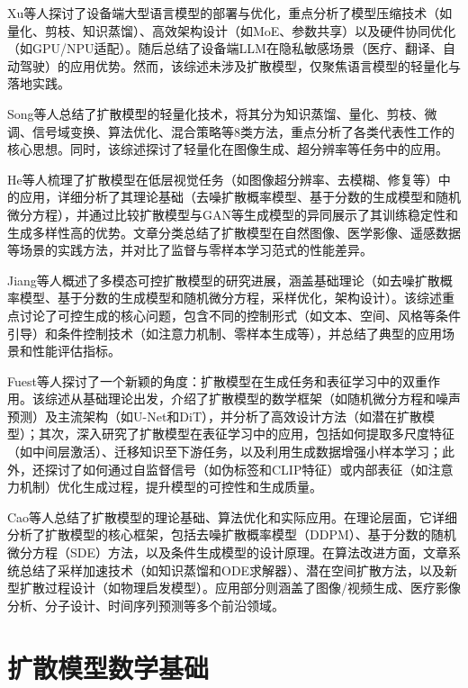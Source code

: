 \documentclass[11pt,a4paper,UTF8]{ctexart}
\begin{document}
Xu等人\cite{xu2024device}探讨了设备端大型语言模型的部署与优化，重点分析了模型压缩技术（如量化、剪枝、知识蒸馏）、高效架构设计（如MoE、参数共享）以及硬件协同优化（如GPU/NPU适配）。随后总结了设备端LLM在隐私敏感场景（医疗、翻译、自动驾驶）的应用优势。然而，该综述未涉及扩散模型，仅聚焦语言模型的轻量化与落地实践。

Song等人\cite{song2024lightweight}总结了扩散模型的轻量化技术，将其分为知识蒸馏、量化、剪枝、微调、信号域变换、算法优化、混合策略等8类方法，重点分析了各类代表性工作的核心思想。同时，该综述探讨了轻量化在图像生成、超分辨率等任务中的应用。

He等人\cite{he2025diffusion}梳理了扩散模型在低层视觉任务（如图像超分辨率、去模糊、修复等）中的应用，详细分析了其理论基础（去噪扩散概率模型、基于分数的生成模型和随机微分方程），并通过比较扩散模型与GAN等生成模型的异同展示了其训练稳定性和生成多样性高的优势。文章分类总结了扩散模型在自然图像、医学影像、遥感数据等场景的实践方法，并对比了监督与零样本学习范式的性能差异。

Jiang等人\cite{jiang2024survey}概述了多模态可控扩散模型的研究进展，涵盖基础理论（如去噪扩散概率模型、基于分数的生成模型和随机微分方程，采样优化，架构设计）。该综述重点讨论了可控生成的核心问题，包含不同的控制形式（如文本、空间、风格等条件引导）和条件控制技术（如注意力机制、零样本生成等），并总结了典型的应用场景和性能评估指标。

Fuest等人\cite{fuest2024diffusion}探讨了一个新颖的角度：扩散模型在生成任务和表征学习中的双重作用。该综述从基础理论出发，介绍了扩散模型的数学框架（如随机微分方程和噪声预测）及主流架构（如U-Net和DiT），并分析了高效设计方法（如潜在扩散模型）；其次，深入研究了扩散模型在表征学习中的应用，包括如何提取多尺度特征（如中间层激活）、迁移知识至下游任务，以及利用生成数据增强小样本学习；此外，还探讨了如何通过自监督信号（如伪标签和CLIP特征）或内部表征（如注意力机制）优化生成过程，提升模型的可控性和生成质量。

Cao等人\cite{cao2024survey}总结了扩散模型的理论基础、算法优化和实际应用。在理论层面，它详细分析了扩散模型的核心框架，包括去噪扩散概率模型（DDPM）、基于分数的随机微分方程（SDE）方法，以及条件生成模型的设计原理。在算法改进方面，文章系统总结了采样加速技术（如知识蒸馏和ODE求解器）、潜在空间扩散方法，以及新型扩散过程设计（如物理启发模型）。应用部分则涵盖了图像/视频生成、医疗影像分析、分子设计、时间序列预测等多个前沿领域。
\fi

\newpage

\section{扩散模型数学基础}
\end{document}
